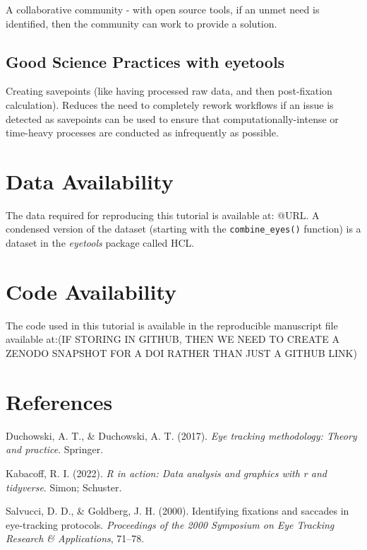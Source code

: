 \documentclass[
  man,
  floatsintext,
  longtable,
  nolmodern,
  notxfonts,
  notimes,
  colorlinks=true,linkcolor=blue,citecolor=blue,urlcolor=blue]{apa7}
\newlength{\cslhangindent}
\newenvironment{CSLReferences}[2] %
 {\begin{list}{}{%
  \setlength{\itemindent}{0pt}
  \setlength{\leftmargin}{0pt}
  \setlength{\parsep}{0pt}
  \ifodd #1
   \setlength{\leftmargin}{\cslhangindent}
   \setlength{\itemindent}{-1\cslhangindent}
  \fi
  \setlength{\itemsep}{#2\baselineskip}}}
 {\end{list}}
\begin{document}
A collaborative community - with open source tools, if an unmet need is
identified, then the community can work to provide a solution.

\subsection{Good Science Practices with
eyetools}\label{good-science-practices-with-eyetools}

Creating savepoints (like having processed raw data, and then
post-fixation calculation). Reduces the need to completely rework
workflows if an issue is detected as savepoints can be used to ensure
that computationally-intense or time-heavy processes are conducted as
infrequently as possible.

\section{Data Availability}\label{data-availability}

The data required for reproducing this tutorial is available at: @URL. A
condensed version of the dataset (starting with the
\texttt{combine\_eyes()} function) is a dataset in the \emph{eyetools}
package called HCL.

\section{Code Availability}\label{code-availability}

The code used in this tutorial is available in the reproducible
manuscript file available at:(IF STORING IN GITHUB, THEN WE NEED TO
CREATE A ZENODO SNAPSHOT FOR A DOI RATHER THAN JUST A GITHUB LINK)

\section{References}\label{references}

\label{refs}
\begin{CSLReferences}{1}{0}
Duchowski, A. T., \& Duchowski, A. T. (2017). \emph{Eye tracking
methodology: Theory and practice}. Springer.

Kabacoff, R. I. (2022). \emph{R in action: Data analysis and graphics
with r and tidyverse}. Simon; Schuster.

Salvucci, D. D., \& Goldberg, J. H. (2000). Identifying fixations and
saccades in eye-tracking protocols. \emph{Proceedings of the 2000
Symposium on Eye Tracking Research \& Applications}, 71--78.

\end{CSLReferences}
\end{document}
